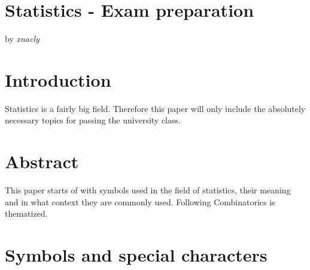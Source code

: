 \documentclass[twoside, a4paper, twocolumn]{article}
\begin{document}
    \section*{Statistics - Exam preparation}
    by \textit{xnacly}

    \tableofcontents

    \section{Introduction}
    Statistics is a fairly big field. Therefore this paper will only include
    the absolutely necessary topics for passing the university class.

    \section{Abstract}
    This paper starts of with symbols used in the field of statistics, their
    meaning and in what context they are commonly used. Following Combinatorics
    is thematized.

    \section{Symbols and special characters}
\end{document}
